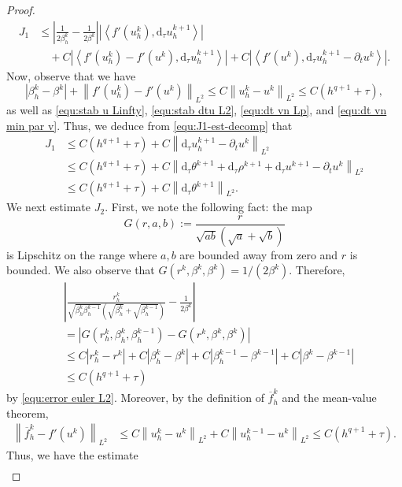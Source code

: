 \documentclass[10pt,a4paper]{amsart}
\newcommand{\abs}[1]{\left|{#1}\right|}
\newcommand{\dtt}{\mathrm{d}_\tau}
\newcommand{\inpro}[2]{\left\langle#1,#2\right\rangle}
\newcommand{\norm}[2]{\left\|{#1}\right\|_{#2}}
\begin{document}
\begin{proof}
	\begin{align}
		J_1
		&\leq
		\abs{
			\frac{1}{2\beta_h^k}
			-
			\frac{1}{2\beta^k}
		}
		\abs{\inpro{f'(u_h^k)}{\dtt u_h^{k+1}}}
		\nonumber\\
		&\quad
		+
		C\abs{
			\inpro{f'(u_h^k)-f'(u^k)}{\dtt u_h^{k+1}}
		}
		+
		C\abs{
			\inpro{f'(u^k)}{\dtt u_h^{k+1}-\partial_t u^k}
		}.
		\label{equ:J1-est-decomp}
	\end{align}
	Now, observe that we have
	\[
	\abs{\beta_h^k-\beta^k} + \norm{f'(u_h^k)-f'(u^k)}{L^2}
	\leq
	C\norm{u_h^k-u^k}{L^2}
	\leq
	C(h^{q+1}+\tau),
	\]
	as well as \eqref{equ:stab u Linfty}, \eqref{equ:stab dtu L2}, \eqref{equ:dt vn Lp}, and \eqref{equ:dt vn min par v}. Thus, we deduce from \eqref{equ:J1-est-decomp} that
	\begin{align}
		J_1
		&\leq
		C(h^{q+1}+\tau)
		+
		C\norm{\dtt u_h^{k+1}-\partial_t u^k}{L^2}
		\nonumber\\
		&\leq
		C(h^{q+1}+\tau)
		+
		C\norm{\dtt\theta^{k+1}+
			\dtt\rho^{k+1}
			+
			\dtt u^{k+1}-\partial_t u^k}{L^2}
		\nonumber\\
		&\leq
		C(h^{q+1}+\tau)
		+
		C\norm{\dtt\theta^{k+1}}{L^2}.
		\label{equ:J1-est}
	\end{align}
	We next estimate $J_2$. First, we note the following fact: the map
	\[
	G(r,a,b):=\frac{r}{\sqrt{ab}(\sqrt a+\sqrt b)}
	\]
	is Lipschitz on the range where $a,b$ are bounded away from zero and $r$ is bounded. We also observe that
	$G(r^k,\beta^k,\beta^k)=1/(2\beta^k)$. Therefore,
	\begin{align}
		&\abs{
			\frac{r_h^k}{\sqrt{\beta_h^k\beta_h^{k-1}}
				(\sqrt{\beta_h^k}+\sqrt{\beta_h^{k-1}})}
			-
			\frac{1}{2\beta^k}
		}
		\nonumber\\
		&=
		\abs{G(r_h^k,\beta_h^k,\beta_h^{k-1})- G(r^k,\beta^k,\beta^k)}
		\nonumber\\
		&
		\leq
		C\abs{r_h^k-r^k}
		+
		C\abs{\beta_h^k-\beta^k}
		+
		C\abs{\beta_h^{k-1}-\beta^{k-1}}
		+
		C\abs{\beta^k-\beta^{k-1}}
		\nonumber\\
		&
		\leq
		C(h^{q+1}+\tau)
		\label{equ:coef-J2}
	\end{align}
	by \eqref{equ:error euler L2}.
	Moreover, by the definition of $\overline f_h^k$ and the mean-value theorem,
	\begin{align}
		\norm{\overline f_h^k-f'(u^k)}{L^2}
		&\leq
		C\norm{u_h^k-u^k}{L^2}
		+
		C\norm{u_h^{k-1}-u^k}{L^2}
		\leq
		C(h^{q+1}+\tau).
		\label{equ:fbar-est}
	\end{align}
	Thus, we have the estimate
	\begin{align}

\end{align}
\end{proof}
\end{document}
